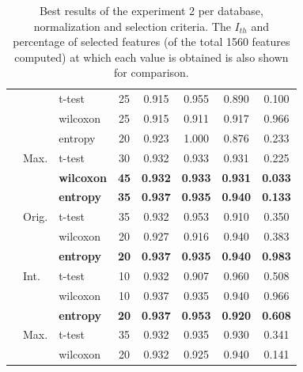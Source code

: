 \begin{table}[htp]
\begin{tabular}{lllccccc}
	                          &                        & t-test    &    25    & 0.915 & 0.955 & 0.890 & 0.100 \\
	                          &                        & wilcoxon  &    25    & 0.915 & 0.911 & 0.917 & 0.966 \\ \cline{2-8}
	                          & \multirow{3}{*}{Max.}  & entropy   &    20    & 0.923 & 1.000 & 0.876 & 0.233 \\
	                          &                        & t-test    &    30    & 0.932 & 0.933 & 0.931 & 0.225 \\
	                          &                        & \textbf{wilcoxon}  &    \textbf{45}    & \textbf{0.932} & \textbf{0.933} & \textbf{0.931} & \textbf{0.033} \\ \midrule
	\multirow{9}{*}{\vdlvdat{}} & \multirow{3}{*}{Orig.} & \textbf{entropy}   &    \textbf{35}    & \textbf{0.937} & \textbf{0.935} & \textbf{0.940} & \textbf{0.133 }\\
	                          &                        & t-test    &    35    & 0.932 & 0.953 & 0.910 & 0.350 \\
	                          &                        & wilcoxon  &    20    & 0.927 & 0.916 & 0.940 & 0.383 \\ \cline{2-8}
	                          & \multirow{3}{*}{Int.}  & \textbf{entropy}   &    \textbf{20}    & \textbf{0.937} & \textbf{0.935} & \textbf{0.940} & \textbf{0.983} \\
	                          &                        & t-test    &    10    & 0.932 & 0.907 & 0.960 & 0.508 \\
	                          &                        & wilcoxon  &    10    & 0.937 & 0.935 & 0.940 & 0.966 \\ \cline{2-8}
	                          & \multirow{3}{*}{Max.}  & \textbf{entropy}   &    \textbf{20}    & \textbf{0.937} & \textbf{0.953} & \textbf{0.920} & \textbf{0.608} \\
	                          &                        & t-test    &    35    & 0.932 & 0.935 & 0.930 & 0.341 \\
	                          &                        & wilcoxon  &    20    & 0.932 & 0.925 & 0.940 & 0.141 \\ \bottomrule
\end{tabular}
	\caption[Best results of the experiment 2 per database, normalization and selection criteria.]{Best results of the experiment 2 per database, normalization and selection criteria. The $I_{th}$ and percentage of selected features (of the total 1560 features computed) at which each value is obtained is also shown for comparison. }
	\label{tab:exp3Res}
\end{table}

